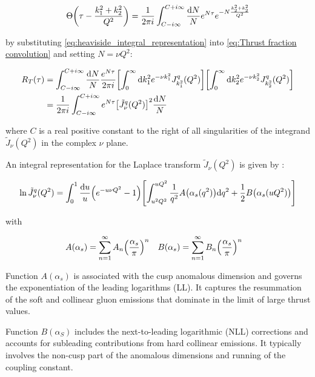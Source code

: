 \documentclass[../main.tex]{subfiles}
\begin{document}
\begin{equation} \label{eq:heaviside_integral_representation}
    \Theta\qty(\tau - \frac{k_1^2+k_2^2}{Q^2}) = \frac{1}{2\pi i} \int_{C-i\infty}^{C+i\infty} \frac{\dd N}{N} e^{N \tau} e^{- N \frac{k_2^2+k_2^2}{Q^2}} 
\end{equation}

by substituting \cref{eq:heaviside_integral_representation} into \cref{eq:Thrust fraction convolution} and setting $N= \nu Q^2$:

\begin{align}
    \begin{split} \label{eq:Thrust fraction}
    R_T(\tau) &= \int_{C - i \infty}^{C + i\infty} \frac{\dd N}{N} \frac{e^{N \tau}}{2\pi i} \qty[\int_0^\infty \dd k_1^2 e^{-\nu k_1^2} J^q_{k_1^2}(Q^2) ] \qty[\int_0^\infty \dd k_2^2 e^{-\nu k_2^2} J^q_{k_2^2}(Q^2)]\\
    &=\frac{1}{2\pi i}\int_{C - i \infty}^{C + i\infty} e^{N \tau} \qty[\tilde{J}_\nu^q(Q^2)]^2 \frac{\dd N}{N}
    \end{split}
\end{align}

where $C$ is a real positive constant to the right of all singularities of the integrand $\tilde{J}_\nu(Q^2)$ in the complex $\nu$ plane. 

An integral representation for the Laplace transform $\tilde{J}_\nu(Q^2)$ is given by \cite{CATANI19933}:

\begin{equation}
    \ln \tilde{J}_\nu^q(Q^2) = \int_0^1 \frac{\dd u}{u} \qty(e^{-u \nu Q^2}-1)\qty[ \int_{u^2 Q^2}^{u Q^2} \frac{1}{q^2} A\qty(\alpha_s(q^2)) \dd q^2 + \frac{1}{2} B\qty(\alpha_s(u Q^2))]
\end{equation}

with 

\begin{align*}
    A(\alpha_s) &= \sum_{n=1}^\infty A_n \qty(\frac{\alpha_s}{\pi})^n & B(\alpha_s) &= \sum_{n=1}^\infty B_n\qty(\frac{\alpha_s}{\pi})^n
\end{align*}

Function $A(\alpha_s)$ is associated with the cusp anomalous dimension and governs the exponentiation of the leading logarithms (LL). 
It captures the resummation of the soft and collinear gluon emissions that dominate in the limit of large thrust values.

Function $B(\alpha_S)$ includes the next-to-leading logarithmic (NLL) corrections and accounts for subleading contributions from hard collinear emissions.
It typically involves the non-cusp part of the anomalous dimensions and running of the coupling constant.
\end{document}

